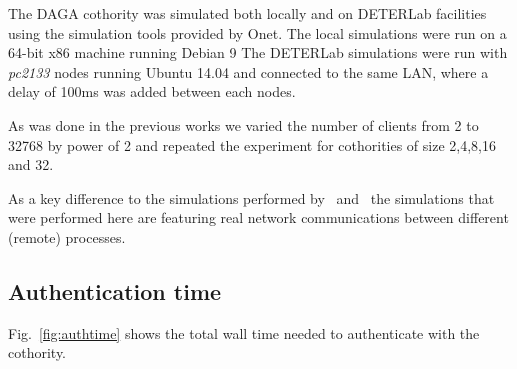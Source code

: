 

    The DAGA cothority was simulated both locally and on DETERLab facilities using the simulation tools provided by Onet.
    The local simulations were run on a 64-bit x86 machine running Debian 9
    The DETERLab simulations were run with \emph{pc2133} nodes running Ubuntu 14.04 and connected to the same LAN,  where a delay of 100ms was added between each nodes.

    As was done in the previous works\cite{syta_identity_2015,villard_report_pfs_pop.pdf_2017} we varied the number of clients from
    2 to 32768 by power of 2 and repeated the experiment for cothorities of size 2,4,8,16 and 32.

    As a key difference to the simulations performed by~\cite{syta_identity_2015} and~\cite{villard_report_pfs_pop.pdf_2017}
    the simulations that were performed here are featuring real network communications between different (remote) processes.

    \subsection{Authentication time}
    \label{subsec:test123}
    Fig.~\ref{fig:authtime} %
    shows the total wall time needed to authenticate with the cothority.\vspace*{1cm}

